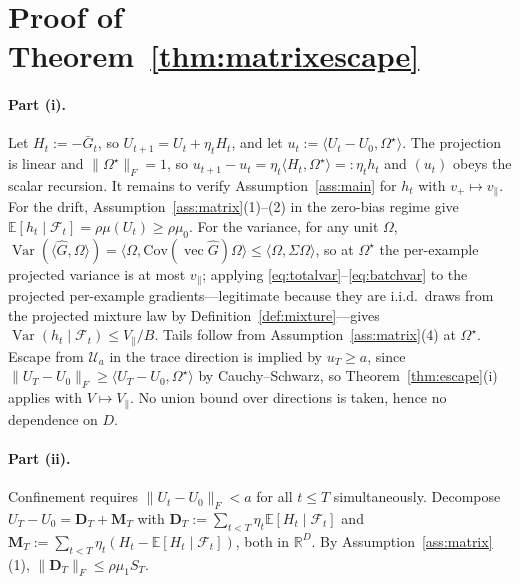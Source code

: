 \documentclass{article}
\theoremstyle{plain}
\theoremstyle{definition}
\theoremstyle{remark}
\newcommand{\E}{\mathbb{E}}
\newcommand{\Var}{\operatorname{Var}}
\newcommand{\R}{\mathbb{R}}
\newcommand{\1}{\mathbf{1}}
\newcommand{\cU}{\mathcal{U}}
\newcommand{\cF}{\mathcal{F}}
\newcommand{\vecop}{\operatorname{vec}}
\newcommand{\Om}{\Omega}
\begin{document}
\section{Proof of Theorem~\ref{thm:matrixescape}}
\label{app:matrix}

\paragraph{Part (i).}
Let $H_t := -\bar G_t$, so $U_{t+1} = U_t+\eta_tH_t$, and let
$u_t := \langle U_t-U_0,\Om^\star\rangle$. The projection is linear and
$\|\Om^\star\|_F = 1$, so $u_{t+1}-u_t = \eta_t\langle H_t,\Om^\star\rangle
=: \eta_th_t$ and $(u_t)$ obeys the scalar recursion. It remains to verify
Assumption~\ref{ass:main} for $h_t$ with $v_+\mapsto v_\parallel$. For the drift,
Assumption~\ref{ass:matrix}(1)--(2) in the zero-bias regime give
$\E[h_t\mid\cF_t] = \rho\mu(U_t)\ge\rho\mu_0$. For the variance, for any unit
$\Om$, $\Var(\langle\hat G,\Om\rangle) =
\langle\Om,\mathrm{Cov}(\vecop\hat G)\Om\rangle\le\langle\Om,\Sigma\Om\rangle$,
so at $\Om^\star$ the per-example projected variance is at most $v_\parallel$;
applying \eqref{eq:totalvar}--\eqref{eq:batchvar} to the projected per-example
gradients---legitimate because they are i.i.d.\ draws from the projected mixture
law by Definition~\ref{def:mixture}---gives
$\Var(h_t\mid\cF_t)\le V_\parallel/B$. Tails follow from
Assumption~\ref{ass:matrix}(4) at $\Om^\star$. Escape from $\cU_a$ in the trace
direction is implied by $u_T\ge a$, since
$\|U_T-U_0\|_F\ge\langle U_T-U_0,\Om^\star\rangle$ by Cauchy--Schwarz, so
Theorem~\ref{thm:escape}(i) applies with $V\mapsto V_\parallel$. No union bound
over directions is taken, hence no dependence on $D$.

\paragraph{Part (ii).}
Confinement requires $\|U_t-U_0\|_F<a$ for all $t\le T$ simultaneously.
Decompose $U_T-U_0 = \mathbf D_T+\mathbf M_T$ with
$\mathbf D_T := \sum_{t<T}\eta_t\E[H_t\mid\cF_t]$ and
$\mathbf M_T := \sum_{t<T}\eta_t(H_t-\E[H_t\mid\cF_t])$, both in $\R^D$. By
Assumption~\ref{ass:matrix}(1), $\|\mathbf D_T\|_F\le\rho\mu_1S_T$.
\end{document}
